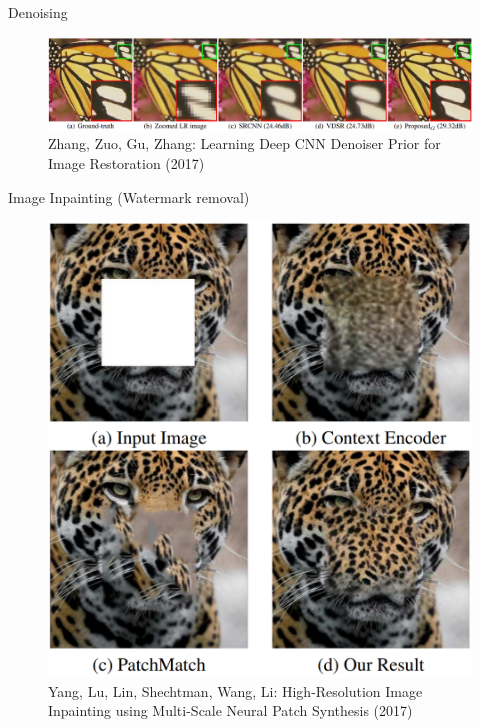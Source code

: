 \documentclass{beamer}
\begin{document}
\begin{frame}{Denoising}
\begin{figure}[ht]
    \centering
    \includegraphics[width=0.8\paperwidth, height=0.7\paperheight, keepaspectratio]{graphics/denoising.png}
    \captionsetup{labelformat=empty}
    \caption{Zhang, Zuo, Gu, Zhang: Learning Deep CNN Denoiser Prior for Image Restoration (2017)}
\end{figure}
\end{frame}


\begin{frame}{Image Inpainting (Watermark removal)}
\begin{figure}[ht]
    \centering
    \includegraphics[width=0.8\paperwidth, height=0.7\paperheight, keepaspectratio]{graphics/leopard-inpainting.png}
    \captionsetup{labelformat=empty}
    \caption{Yang, Lu, Lin, Shechtman, Wang, Li: High-Resolution Image Inpainting using Multi-Scale Neural Patch Synthesis (2017)}
\end{figure}
\end{frame}
\end{document}
